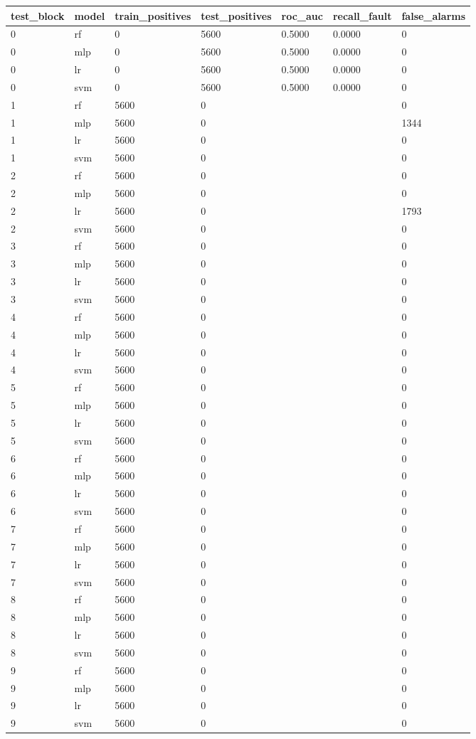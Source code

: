 \begin{tabular}{lllllll}
\toprule
test\_block & model & train\_positives & test\_positives & roc\_auc & recall\_fault & false\_alarms \\
\midrule
0 & rf & 0 & 5600 & 0.5000 & 0.0000 & 0 \\
0 & mlp & 0 & 5600 & 0.5000 & 0.0000 & 0 \\
0 & lr & 0 & 5600 & 0.5000 & 0.0000 & 0 \\
0 & svm & 0 & 5600 & 0.5000 & 0.0000 & 0 \\
1 & rf & 5600 & 0 &  &  & 0 \\
1 & mlp & 5600 & 0 &  &  & 1344 \\
1 & lr & 5600 & 0 &  &  & 0 \\
1 & svm & 5600 & 0 &  &  & 0 \\
2 & rf & 5600 & 0 &  &  & 0 \\
2 & mlp & 5600 & 0 &  &  & 0 \\
2 & lr & 5600 & 0 &  &  & 1793 \\
2 & svm & 5600 & 0 &  &  & 0 \\
3 & rf & 5600 & 0 &  &  & 0 \\
3 & mlp & 5600 & 0 &  &  & 0 \\
3 & lr & 5600 & 0 &  &  & 0 \\
3 & svm & 5600 & 0 &  &  & 0 \\
4 & rf & 5600 & 0 &  &  & 0 \\
4 & mlp & 5600 & 0 &  &  & 0 \\
4 & lr & 5600 & 0 &  &  & 0 \\
4 & svm & 5600 & 0 &  &  & 0 \\
5 & rf & 5600 & 0 &  &  & 0 \\
5 & mlp & 5600 & 0 &  &  & 0 \\
5 & lr & 5600 & 0 &  &  & 0 \\
5 & svm & 5600 & 0 &  &  & 0 \\
6 & rf & 5600 & 0 &  &  & 0 \\
6 & mlp & 5600 & 0 &  &  & 0 \\
6 & lr & 5600 & 0 &  &  & 0 \\
6 & svm & 5600 & 0 &  &  & 0 \\
7 & rf & 5600 & 0 &  &  & 0 \\
7 & mlp & 5600 & 0 &  &  & 0 \\
7 & lr & 5600 & 0 &  &  & 0 \\
7 & svm & 5600 & 0 &  &  & 0 \\
8 & rf & 5600 & 0 &  &  & 0 \\
8 & mlp & 5600 & 0 &  &  & 0 \\
8 & lr & 5600 & 0 &  &  & 0 \\
8 & svm & 5600 & 0 &  &  & 0 \\
9 & rf & 5600 & 0 &  &  & 0 \\
9 & mlp & 5600 & 0 &  &  & 0 \\
9 & lr & 5600 & 0 &  &  & 0 \\
9 & svm & 5600 & 0 &  &  & 0 \\
\bottomrule
\end{tabular}
